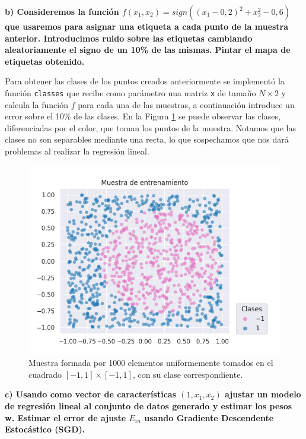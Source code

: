 \documentclass[a4paper, 20pt]{article}
\begin{document}
\textbf{b) Consideremos la función $f(x_1, x_2) = sign((x_1 - 0,2)^2 + x_2^2 - 0,6)$ que usaremos para asignar una etiqueta a cada punto de la muestra anterior. Introducimos ruido sobre las etiquetas cambiando aleatoriamente el signo de un 10\% de las mismas. Pintar el mapa de etiquetas obtenido.}

Para obtener las clases de los puntos creados anteriormente se implementó la función \texttt{classes} que recibe como parámetro una matriz \texttt{x} de tamaño $N\times 2$ y calcula la función $f$ para cada una de las muestras, a continuación introduce un error sobre el 10\% de las clases. En la Figura \ref{fig:22b} se puede observar las clases, diferenciadas por el color, que toman los puntos de la muestra. Notamos que las clases no son separables mediante una recta, lo que sospechamos que nos dará problemas al realizar la regresión lineal.

\begin{figure}[H]
    \centering
    \includegraphics[width=1\textwidth]{clases2d}
    \caption{Muestra formada por 1000 elementos uniformemente tomados en el cuadrado $[-1,1]\times[-1,1]$, con su clase correspondiente.}
    \label{fig:22b}
\end{figure}

\textbf{c) Usando como vector de características $(1, x_1 , x_2)$ ajustar un modelo de regresión lineal al conjunto de datos generado y estimar los pesos w. Estimar el error de ajuste $E_{in}$ usando Gradiente Descendente Estocástico (SGD).}
\end{document}
